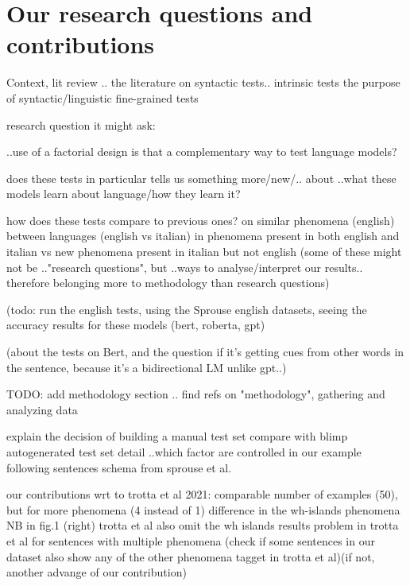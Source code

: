 \section{Our research questions and contributions}


Context, lit review ..
the literature on syntactic tests.. intrinsic tests
the purpose of syntactic/linguistic fine-grained tests

research question it might ask:

..use of a factorial design
is that a complementary way to test language models?

does these tests in particular tells us something more/new/.. about ..what these models learn about language/how they learn it?

how does these tests compare to previous ones? on similar phenomena (english)
between languages (english vs italian)
in phenomena present in both english and italian vs new phenomena present in italian but not english
(some of these might not be .."research questions", but ..ways to analyse/interpret our results.. therefore belonging more to methodology than research questions)

(todo: run the english tests, using the Sprouse english datasets, seeing the accuracy results for these models (bert, roberta, gpt)

(about the tests on Bert, and the question if it's getting cues from other words in the sentence, because it's a bidirectional LM unlike gpt..)

TODO: add methodology section .. find refs on "methodology", gathering and analyzing data

explain the decision of building a manual test set
compare with blimp autogenerated test set
detail ..which factor are controlled in our example
following sentences schema from sprouse et al.


our contributions wrt to trotta et al 2021:
comparable number of examples (50), but for more phenomena (4 instead of 1)
difference in the wh-islands phenomena
NB in fig.1 (right) trotta et al also omit the wh islands results
problem in trotta et al for sentences with multiple phenomena
(check if some sentences in our dataset also show any of the other phenomena tagget in trotta et al)(if not, another advange of our contribution)



